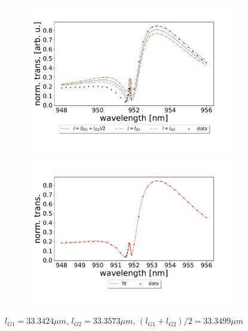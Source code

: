 \begin{figure}[h!]
    \centering
    \begin{subfigure}[b]{0.49\textwidth}
        \centering
        \includegraphics[width=\textwidth]{figures/results/34um_long_scan_sim_comparison.pdf}
        \caption{}
        \label{fig:34um_long_scan_sim_comparison}
    \end{subfigure}
    \begin{subfigure}[b]{0.49\textwidth}
        \centering
        \includegraphics[width=\textwidth]{figures/results/34um_long_scan_fit.pdf}
        \caption{}
        \label{fig:34um_long_scan_fit}
    \end{subfigure}
    \caption{$l_{G1} = 33.3424 \mu m$, $l_{G2} = 33.3573 \mu m$, $(l_{G1} + l_{G2})/2 = 33.3499 \mu m$}
    \label{fig:34um_cavity_fit_and_sim}
\end{figure}

